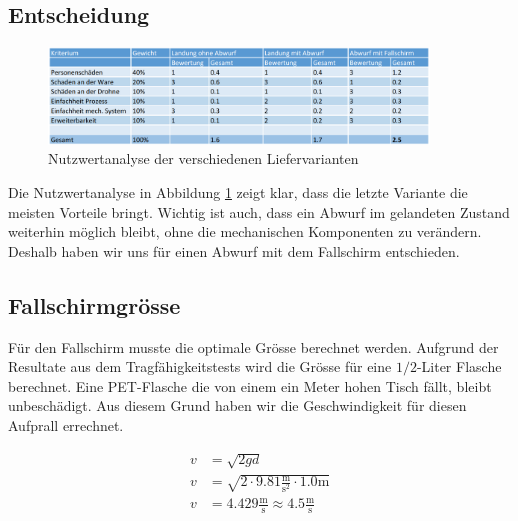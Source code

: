 \subsection{Entscheidung}

\begin{figure}[H]
	\centering
	\includegraphics[width=0.9\textwidth] {images/nutzwertanalyse_abwurf.png} 
	\caption{Nutzwertanalyse der verschiedenen Liefervarianten}
	\label{fig:nutzwertanalyse_abwurf}
\end{figure}


Die Nutzwertanalyse in Abbildung \ref{fig:nutzwertanalyse_abwurf} zeigt klar, dass die letzte Variante die meisten Vorteile bringt. Wichtig ist auch, dass ein Abwurf im gelandeten Zustand weiterhin möglich bleibt, ohne die mechanischen Komponenten zu verändern. Deshalb haben wir uns für einen Abwurf mit dem Fallschirm entschieden.

\subsection{Fallschirmgrösse}

Für den Fallschirm musste die optimale Grösse berechnet werden. Aufgrund der Resultate aus dem Tragfähigkeitstests wird die Grösse für eine $1/2$-Liter Flasche berechnet.
Eine PET-Flasche die von einem ein Meter hohen Tisch fällt, bleibt unbeschädigt. Aus diesem Grund haben wir die Geschwindigkeit für diesen Aufprall errechnet.

\begin{equation}
\label{eq:pet}
\begin{split}
v &= \sqrt{2gd} \\
v &= \sqrt{2 \cdot 9.81\frac{\text{m}}{\text{s}^2} \cdot 1.0\text{m}} \\
v &= 4.429 \frac{\text{m}}{\text{s}} \approx 4.5 \frac{\text{m}}{\text{s}} \\
\end{split}
\end{equation}

